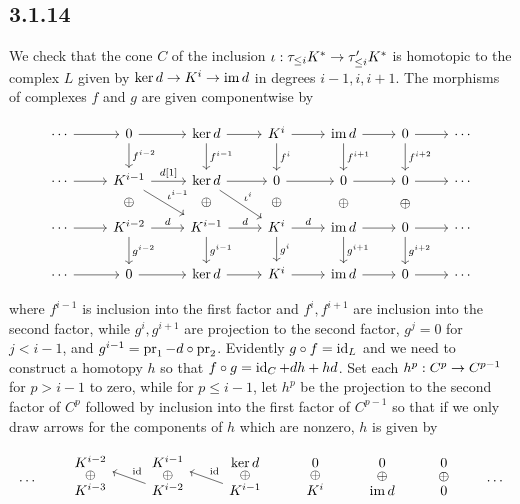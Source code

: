 \documentclass[deligne.tex]{subfiles}
\begin{document}
\subsection*{3.1.14} We check that the cone $C$ of the inclusion
$\iota:\tau_{\leq i}K^*\rightarrow\tau_{\leq i}'K^*$ is homotopic to the complex
$L$ given by $\ker d\rightarrow K^i\rightarrow\operatorname{im} d$ in degrees $i-1,i,i+1$.
The morphisms of complexes $f$ and $g$ are given componentwise by
\begin{ceqn}\begin{equation*}\begin{tikzcd}
	\cdots\arrow[r]
	&0\arrow[r]\arrow[d,"f^{i-2}"]
	&\ker d\arrow[r]\arrow[d,"f^{i-1}"]
	&K^i\arrow[r]\arrow[d,"f^i"]
	&\im d\arrow[r]\arrow[d,"f^{i+1}"]
	&0\arrow[r]\arrow[d,"f^{i+2}"]
	&\cdots \\
	\cdots\arrow[r]
	&K^{i-1}\arrow[d,phantom,"\oplus"]\arrow[r,"{d[1]}"]\arrow[dr,"\iota^{i-1}"]
	&\ker d\arrow[r]\arrow[d,phantom,"\oplus"]\arrow[dr,"\iota^{i}"]
	&0\arrow[r]\arrow[d,phantom,"\oplus"]
	&0\arrow[r]\arrow[d,phantom,"\oplus"]
	&0\arrow[r]\arrow[d,phantom,"\oplus"]
	&\cdots \\
	\cdots\arrow[r]
	&K^{i-2}\arrow[r,"d"]\arrow[d,"g^{i-2}"]
	&K^{i-1}\arrow[r,"d"]\arrow[d,"g^{i-1}"]
	&K^{i}\arrow[r,"d"]\arrow[d,"g^i"]
	&\im d\arrow[r]\arrow[d,"g^{i+1}"]
	&0\arrow[r]\arrow[d,"g^{i+2}"]
	&\cdots \\
	\cdots\arrow[r]
	&0\arrow[r]
	&\ker d\arrow[r]
	&K^i\arrow[r]
	&\im d\arrow[r]
	&0\arrow[r]
	&\cdots
\end{tikzcd}\end{equation*}\end{ceqn}
where $f^{i-1}$ is inclusion into the first factor and $f^i,f^{i+1}$
are inclusion into the second factor, while $g^i,g^{i+1}$ are projection to
the second factor, $g^j=0$ for $j<i-1$, and $g^{i-1}=\operatorname{pr}_1-d\circ\operatorname{pr}_2$.
Evidently $g\circ f=\operatorname{id}_L$ and we need to construct a homotopy $h$ so that
$f\circ g=\operatorname{id}_C+dh+hd$. Set each $h^p:C^p\rightarrow C^{p-1}$ for $p>i-1$ to zero,
while for $p\leq i-1$, let $h^p$ be the projection to the
second factor of $C^p$ followed by inclusion into the first factor of
$C^{p-1}$ so that if we only draw arrows for the components of $h$ which
are nonzero, $h$ is given by
\begin{ceqn}\begin{equation*}\begin{tikzcd}[row sep=tiny]
	\;\arrow[d,phantom,"\cdots"]
	&K^{i-2}\arrow[d,phantom,"\oplus"]
	&K^{i-1}\arrow[d,phantom,"\oplus"]
	&\ker d\arrow[d,phantom,"\oplus"]
	&0\arrow[d,phantom,"\oplus"]
	&0\arrow[d,phantom,"\oplus"]
	&0\arrow[d,phantom,"\oplus"]
	&\;\arrow[d,phantom,"\cdots"] \\
	\;
	&K^{i-3}
	&K^{i-2}\arrow[ul,"\id"']
	&K^{i-1} \arrow[ul,"\id"']
	&K^{i}
	&\im d
	&0
	&\;
\end{tikzcd}\end{equation*}\end{ceqn}
\end{document}
